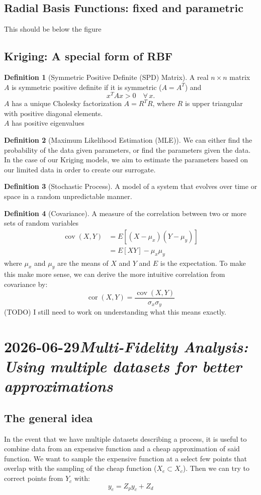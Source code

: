\documentclass[11pt]{article}
\newcommand{\entry}[2]{\clearpage\section[#2]{#1\quad\textnormal{\textit{#2}}}}
\newcommand{\subentry}[1]{\subsection{#1}}
\theoremstyle{definition}
\newtheorem{definition}{Definition}
\begin{document}
\subentry{Radial Basis Functions: fixed and parametric}
This should be below the figure
\subentry{Kriging: A special form of RBF}

\begin{definition}[Symmetric Positive Definite (SPD) Matrix]
  A real $n \times n$ matrix $A$ is symmetric positive definite if it is
  symmetric ($A = A^T$) and
  \[
    x^T A x > 0 \quad \forall\, x.
  \]
  $A$ has a unique Cholesky factorization $A = R^TR$, where $R$ is upper triangular with positive diagonal elements.
  \\
  $A$ has positive eigenvalues
\end{definition}

\begin{definition}[Maximum Likelihood Estimation (MLE)]
    We can either find the probability of the data given parameters, or find
    the parameters given the data. In the case of our Kriging models, we aim to estimate the parameters based on
    our limited data in order to create our surrogate.
\end{definition}

\begin{definition}[Stochastic Process]
    A model of a system that evolves over time or space in a random unpredictable manner.
\end{definition}

\begin{definition}[Covariance]
A measure of the correlation between two or more sets of random variables
\begin{align}
\operatorname{cov}(X,Y) &= E[(X - \mu_x)(Y - \mu_y)] \\
                        &= E[XY] - \mu_x\mu_y
\label{eq:covariance}
\end{align}
where $\mu_x$ and $\mu_y$ are the means of $X$ and $Y$ and $E$ is the expectation. To make this make more sense,
we can derive the more intuitive correlation from covariance by:
\begin{equation}
\operatorname{cor}(X,Y) = \frac{\operatorname{cov}(X,Y)}{\sigma_x\sigma_y}
\label{eq:correlation}
\end{equation}
(TODO) I still need to work on understanding what this means exactly.
\end{definition}

\entry{2026-06-29}{Multi-Fidelity Analysis: Using multiple datasets for better approximations}
\subentry{The general idea}
In the event that we have multiple datasets describing a process,
it is useful to combine data from an expensive function and a cheap approximation of 
said function. We want to sample the expensive function at a select few points that overlap with
the sampling of the cheap function ($X_e \subset X_c$). Then we can try to correct points from $Y_c$
with:
\begin{equation}
  y_e = Z_py_c + Z_d
  \label{eq:multi-fidelity}
\end{equation}
\end{document}
